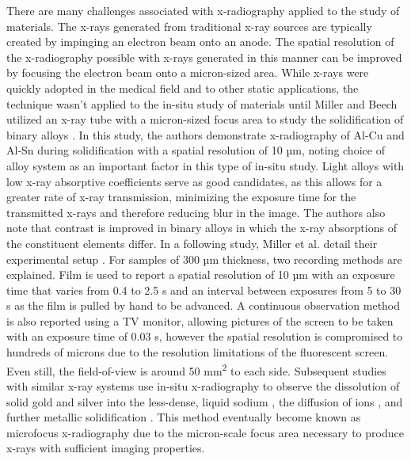 There are many challenges associated with x-radiography applied to the
study of materials. The x-rays generated from traditional x-ray sources
are typically created by impinging an electron beam onto an anode. The
spatial resolution of the x-radiography possible with x-rays generated in
this manner can be improved by focusing the electron beam onto a
micron-sized area. While x-rays were quickly adopted in the medical field
and to other static applications, the technique wasn't applied to the
in-situ study of materials until Miller and Beech utilized an x-ray tube
with a micron-sized focus area to study the solidification of binary
alloys \cite{Miller1972}. In this study, the authors demonstrate
x-radiography of Al-Cu and Al-Sn during solidification with a spatial
resolution of 10 µm, noting choice of alloy system as an important factor
in this type of in-situ study. Light alloys with low x-ray absorptive
coefficients serve as good candidates, as this allows for a greater rate of
x-ray transmission, minimizing the exposure time for the transmitted
x-rays and therefore reducing blur in the image. The authors also note
that contrast is improved in binary alloys in which the x-ray absorptions
of the constituent elements differ. In a following study, Miller et al.
detail their experimental setup \cite{Miller1975}. For samples of 300 µm
thickness, two recording methods are explained. Film is used to report a
spatial resolution of 10 µm with an exposure time that varies from 0.4 to
2.5 s and an interval between exposures from 5 to 30 s as the film is
pulled by hand to be advanced. A continuous observation method is also
reported using a TV monitor, allowing pictures of the screen to be taken
with an exposure time of 0.03 s, however the spatial resolution is
compromised to hundreds of microns due to the resolution limitations of
the fluorescent screen. Even still, the field-of-view is around
50 mm\textsuperscript{2} to
each side. Subsequent studies with similar x-ray systems use in-situ
x-radiography to observe the dissolution of solid gold and silver into the
less-dense, liquid sodium \cite{Cappleman1982}, the diffusion of ions
\cite{Rondot1994}, and further metallic solidification \cite{Barber1995,
Koster1997, Curreri1996, Kaukler1997}. This method eventually become known
as microfocus x-radiography due to the micron-scale focus area necessary
to produce x-rays with sufficient imaging properties.

